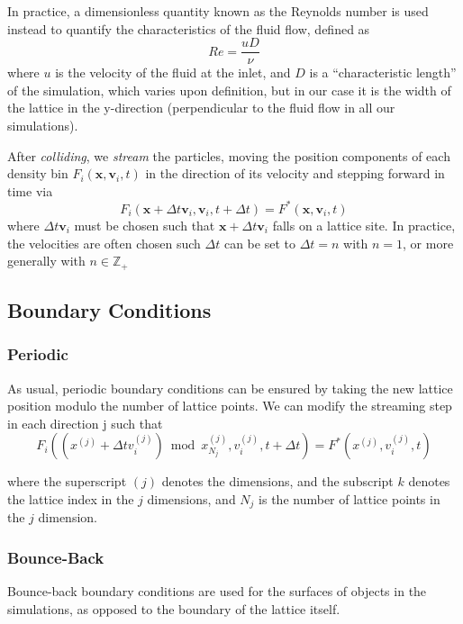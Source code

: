 In practice, a dimensionless quantity known as the Reynolds number is used instead to quantify the characteristics of the fluid flow, defined as~\cite{bottcher_computational_2021}
\begin{equation}
  Re = \frac{uD}{\nu}
\end{equation}
where $u$ is the velocity of the fluid at the inlet, and $D$ is a ``characteristic length'' of the simulation, which varies upon definition, but in our case it is the width of the lattice in the y-direction (perpendicular to the fluid flow in all our simulations).



After \emph{colliding}, we \emph{stream} the particles, moving the position components of each density bin $F_{i}(\mathbf x, \mathbf v_{i}, t)$ in the direction of its velocity and stepping forward in time via
\begin{equation}
  F_{i}(\mathbf x + \Delta t\mathbf v_{i}, \mathbf v_{i}, t + \Delta t)
  = F^{*}(\mathbf x, \mathbf v_{i}, t)
\end{equation}
where $\Delta t \mathbf v_{i}$ must be chosen such that $\mathbf x + \Delta t \mathbf v_{i}$ falls on a lattice site.
In practice, the velocities are often chosen such $\Delta t$ can be set to $\Delta t = n$ with $n = 1$, or more generally with $n \in \mathbb{Z}_{+}$
\subsection{Boundary Conditions}

\subsubsection{Periodic}
As usual, periodic boundary conditions can be ensured by taking the new lattice position modulo the number of lattice points.
We can modify the streaming step in each direction j such that
\begin{equation}
  F_{i}\left((x^{(j)} + \Delta t v^{(j)}_{i})\bmod x^{(j)}_{N_{j}}, v^{(j)}_{i}, t + \Delta t\right)
  = F^{*}(x^{(j)}, v^{(j)}_{i}, t)
\end{equation}

where the superscript $(j)$ denotes the dimensions, and the subscript $k$ denotes the lattice index in the $j$ dimensions, and $N_{j}$ is the number of lattice points in the $j$ dimension.



\subsubsection{Bounce-Back}
Bounce-back boundary conditions are used for the surfaces of objects in the simulations, as opposed to the boundary of the lattice itself.

